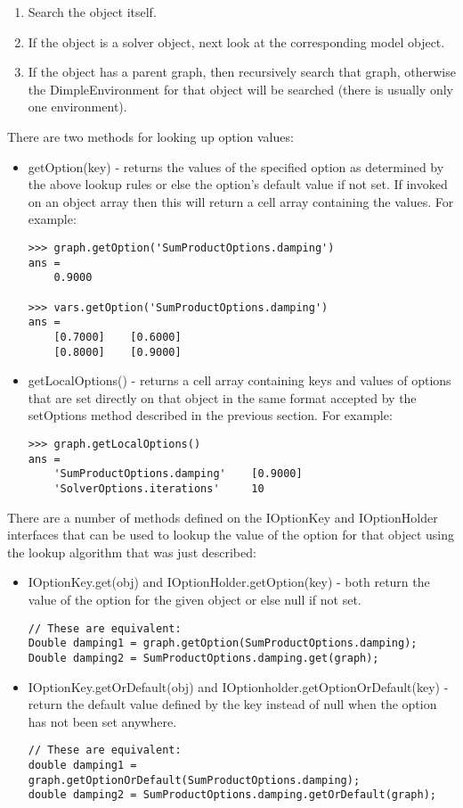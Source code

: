 \begin{enumerate}
\item Search the object itself.
\item If the object is a solver object, next look at the corresponding model object.
\item If the object has a parent graph, then recursively search that graph,
otherwise the DimpleEnvironment for that object will be searched (there is usually only one environment).
\end{enumerate}

\ifmatlab
There are two methods for looking up option values:

\begin{itemize}
\item getOption(key) - returns the values of the specified option as determined by the above lookup rules or else the option's default value if not set. If invoked on an object array then this will return a cell array containing the values. For example:
\begin{lstlisting}
>>> graph.getOption('SumProductOptions.damping')
ans =
    0.9000
    
>>> vars.getOption('SumProductOptions.damping')
ans =
    [0.7000]    [0.6000]
    [0.8000]    [0.9000]
\end{lstlisting}

\item getLocalOptions() - returns a cell array containing keys and values of options that are set directly on that object in the same format accepted by the setOptions method described in the previous section. For example:
\begin{lstlisting}
>>> graph.getLocalOptions()
ans =
    'SumProductOptions.damping'    [0.9000]
    'SolverOptions.iterations'     10
\end{lstlisting}
\end{itemize}
\fi %

\ifjava
There are a number of methods defined on the IOptionKey and IOptionHolder interfaces that can be used to lookup the value of the option for that object using the lookup algorithm that was just described:

\begin{itemize}
\item IOptionKey.get(obj) and IOptionHolder.getOption(key) - both return the value of the option for the given object or else null if not set.
\begin{lstlisting}
// These are equivalent:
Double damping1 = graph.getOption(SumProductOptions.damping);
Double damping2 = SumProductOptions.damping.get(graph);
\end{lstlisting}
\item IOptionKey.getOrDefault(obj) and IOptionholder.getOptionOrDefault(key) - return the default value defined by the key instead of null when the option has not been set anywhere.
\begin{lstlisting}
// These are equivalent:
double damping1 = graph.getOptionOrDefault(SumProductOptions.damping);
double damping2 = SumProductOptions.damping.getOrDefault(graph);
\end{lstlisting}
\end{itemize}

